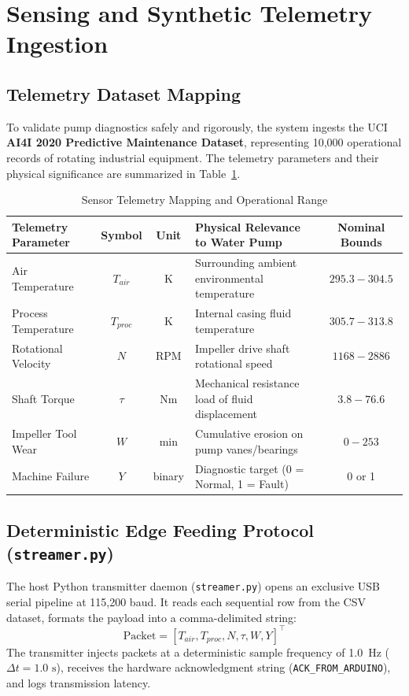 \documentclass[11pt,a4paper]{article}
\begin{document}
\section{Sensing and Synthetic Telemetry Ingestion}

\subsection{Telemetry Dataset Mapping}
To validate pump diagnostics safely and rigorously, the system ingests the UCI \textbf{AI4I 2020 Predictive Maintenance Dataset}, representing 10,000 operational records of rotating industrial equipment. The telemetry parameters and their physical significance are summarized in Table~\ref{tab:sensors}.

\begin{table}[h!]
\centering
\small
\caption{Sensor Telemetry Mapping and Operational Range}
\label{tab:sensors}
\begin{tabularx}{\textwidth}{l c c X c}
\toprule
\textbf{Telemetry Parameter} & \textbf{Symbol} & \textbf{Unit} & \textbf{Physical Relevance to Water Pump} & \textbf{Nominal Bounds} \\
\midrule
Air Temperature & $T_{air}$ & K & Surrounding ambient environmental temperature & $295.3 - 304.5$ \\
Process Temperature & $T_{proc}$ & K & Internal casing fluid temperature & $305.7 - 313.8$ \\
Rotational Velocity & $N$ & RPM & Impeller drive shaft rotational speed & $1168 - 2886$ \\
Shaft Torque & $\tau$ & Nm & Mechanical resistance load of fluid displacement & $3.8 - 76.6$ \\
Impeller Tool Wear & $W$ & min & Cumulative erosion on pump vanes/bearings & $0 - 253$ \\
Machine Failure & $Y$ & binary & Diagnostic target (0 = Normal, 1 = Fault) & 0 or 1 \\
\bottomrule
\end{tabularx}
\end{table}

\subsection{Deterministic Edge Feeding Protocol (\texttt{streamer.py})}
The host Python transmitter daemon (\texttt{streamer.py}) opens an exclusive USB serial pipeline at 115,200 baud. It reads each sequential row from the CSV dataset, formats the payload into a comma-delimited string:
\begin{equation}
    \text{Packet} = \left[ T_{air}, T_{proc}, N, \tau, W, Y \right]^\top
\end{equation}
The transmitter injects packets at a deterministic sample frequency of 1.0~Hz ($\Delta t = 1.0\text{ s}$), receives the hardware acknowledgment string (\texttt{ACK\_FROM\_ARDUINO}), and logs transmission latency.
\end{document}
